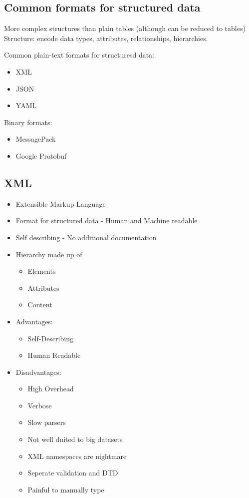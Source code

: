 \documentclass[a4paper]{article}
\begin{document}
\subsection{Common formats for structured data}
More complex structures than plain tables (although can be reduced to tables)
Structure: encode data types, attributes, relationships, hierarchies.
\par Common plain-text formats for structuresd data:
\begin{itemize}
	\item XML
	\item JSON
	\item YAML
\end{itemize}
\par Binary formats:
\begin{itemize}
	\item MessagePack
	\item Google Protobuf
\end{itemize}
\subsection{XML}
\begin{itemize}
	\item Extensible Markup Language
	\item Format for structured data - Human and Machine readable
	\item Self describing - No additional documentation
	\item Hierarchy made up of
	\begin{itemize}
		\item Elements
		\item Attributes
		\item Content
	\end{itemize}
	\item Advantages:
	\begin{itemize}
		\item Self-Describing
		\item Human Readable
	\end{itemize}
	\item Disadvantages:
	\begin{itemize}
		\item High Overhead
		\item Verbose
		\item Slow parsers
		\item Not well duited to big datasets
		\item XML namespaces are nightmare
		\item Seperate validation and DTD
		\item Painful to manually type
	\end{itemize}
\end{itemize}
\end{document}
